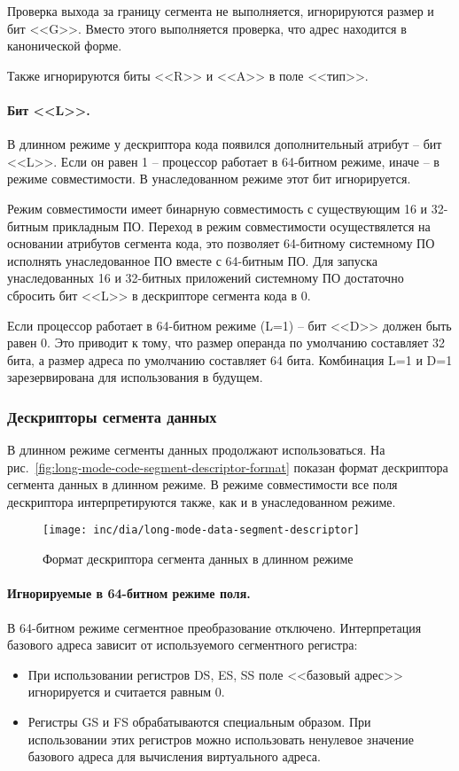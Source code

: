 Проверка выхода за границу сегмента не выполняется, игнорируются размер и бит <<G>>. Вместо этого выполняется
проверка, что адрес находится в канонической форме.

Также игнорируются биты <<R>> и <<A>> в поле <<тип>>.

\paragraph{Бит <<L>>.} В длинном режиме у дескриптора кода появился дополнительный атрибут -- бит <<L>>. Если он равен 1 --
процессор работает в 64-битном режиме, иначе -- в режиме совместимости. В унаследованном режиме этот бит игнорируется.

Режим совместимости имеет бинарную совместимость с существующим 16 и 32-битным прикладным ПО.
Переход в режим совместимости осуществялется на основании атрибутов сегмента кода, это позволяет
64-битному системному ПО исполнять унаследованное ПО вместе с 64-битным ПО. Для запуска унаследованных
16 и 32-битных приложений системному ПО достаточно сбросить бит <<L>> в дескрипторе сегмента кода в 0.

Если процессор работает в 64-битном режиме (L=1) -- бит <<D>> должен быть равен 0. Это приводит к тому,
что размер операнда по умолчанию составляет 32 бита, а размер адреса по умолчанию составляет 64 бита.
Комбинация L=1 и D=1 зарезервирована для использования в будущем.

\subsubsection*{Дескрипторы сегмента данных}
В длинном режиме сегменты данных продолжают использоваться. На рис.~\ref{fig:long-mode-code-segment-descriptor-format}
показан формат дескриптора сегмента данных в длинном режиме. В режиме совместимости все поля дескриптора
интерпретируются также, как и в унаследованном режиме.

\begin{figure}[ht!]
  \centering
  \texttt{[image: inc/dia/long-mode-data-segment-descriptor]}
  \caption{Формат дескриптора сегмента данных в длинном режиме}
  \label{fig:long-mode-data-segment-descriptor-format}
\end{figure}

\paragraph{Игнорируемые в 64-битном режиме поля.}
В 64-битном режиме сегментное преобразование отключено. Интерпретация базового адреса зависит от
используемого сегментного регистра:
\begin{itemize}
\item При использовании регистров DS, ES, SS поле <<базовый адрес>> игнорируется и считается равным 0.
\item Регистры GS и FS обрабатываются специальным образом. При использовании этих регистров можно
	использовать ненулевое значение базового адреса для вычисления виртуального адреса.
\end{itemize}

